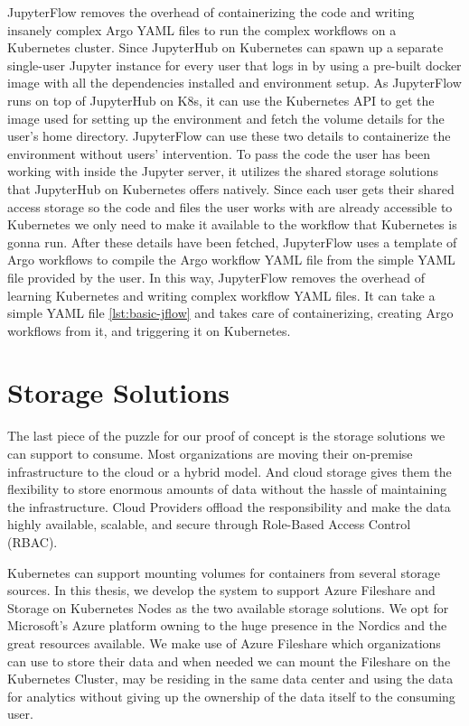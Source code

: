 \bigskip
JupyterFlow removes the overhead of containerizing the code and writing insanely complex Argo YAML files to run the complex workflows on a Kubernetes cluster. Since JupyterHub on Kubernetes can spawn up a separate single-user Jupyter instance for every user that logs in by using a pre-built docker image with all the dependencies installed and environment setup. As JupyterFlow runs on top of JupyterHub on K8s, it can use the Kubernetes API to get the image used for setting up the environment and fetch the volume details for the user's home directory. JupyterFlow can use these two details to containerize the environment without users' intervention. To pass the code the user has been working with inside the Jupyter server, it utilizes the shared storage solutions that JupyterHub on Kubernetes offers natively. Since each user gets their shared access storage so the code and files the user works with are already accessible to Kubernetes we only need to make it available to the workflow that Kubernetes is gonna run. After these details have been fetched, JupyterFlow uses a template of Argo workflows to compile the Argo workflow YAML file from the simple YAML file provided by the user. In this way, JupyterFlow removes the overhead of learning Kubernetes and writing complex workflow YAML files. It can take a simple YAML file \ref{lst:basic-jflow} and takes care of containerizing, creating Argo workflows from it, and triggering it on Kubernetes.

\section{Storage Solutions}
The last piece of the puzzle for our proof of concept is the storage solutions we can support to consume. Most organizations are moving their on-premise infrastructure to the cloud or a hybrid model. And cloud storage gives them the flexibility to store enormous amounts of data without the hassle of maintaining the infrastructure. Cloud Providers offload the responsibility and make the data highly available, scalable, and secure through Role-Based Access Control (RBAC). 

\bigskip
Kubernetes can support mounting volumes for containers from several storage sources. In this thesis, we develop the system to support Azure Fileshare and Storage on Kubernetes Nodes as the two available storage solutions. We opt for Microsoft's Azure platform owning to the huge presence in the Nordics and the great resources available. We make use of Azure Fileshare which organizations can use to store their data and when needed we can mount the Fileshare on the Kubernetes Cluster, may be residing in the same data center and using the data for analytics without giving up the ownership of the data itself to the consuming user. 

